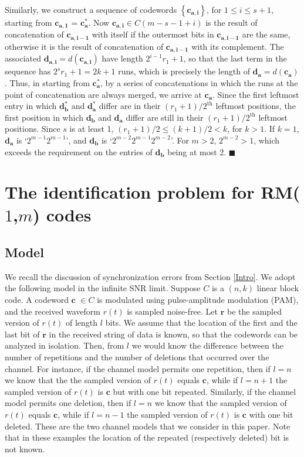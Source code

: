Similarly, we construct a sequence of codewords
$\left\{\mathbf{c_{a,i}}\right\}$, for $1 \leq i \leq s+1$,
starting from $\mathbf{c_{a,1}}$ = $\mathbf{c_a^{*}}$. Now
$\mathbf{c_{a,i}} \in C(m-s-1+i)$ is the result of concatenation
of $\mathbf{c_{a,i-1}}$ with itself if the outermost bits in
$\mathbf{c_{a,i-1}}$ are the same, otherwise it is  the result of
concatenation of $\mathbf{c_{a,i-1}}$ with its complement. The
associated $\mathbf{d_{a,i}}=d(\mathbf{c_{a,i}})$ have length
$2^{i-1}r_1+1$, so that the last term in the sequence has
$2^sr_1+1=2k+1$ runs, which is precisely the length of
$\mathbf{d_a}=d(\mathbf{c_a})$. Thus, in starting from
$\mathbf{c_a^{*}}$, by a series of concatenations in which the
runs at the point of concatenation are always merged, we arrive at
$\mathbf{c_a}$. Since the first leftmost entry in which
$\mathbf{d_b^{*}}$ and $\mathbf{d_a^{*}}$ differ are in their
$(r_1+1)/2^{\text{th}}$ leftmost positions, the first position in
which $\mathbf{d_b}$ and $\mathbf{d_a}$ differ are still in their
$(r_1+1)/2^{\text{th}}$ leftmost positions. Since $s$ is at least
1, $(r_1+1)/2 \leq (k+1)/2 < k$, for $k>1$. If $k=1$,
$\mathbf{d_a}$ is `$2^{m-1}2^{m-1}$', and $\mathbf{d_b}$ is
`$2^{m-2}2^{m-1}2^{m-2}$'. For $m>2$, $2^{m-2}>1$, which exceeds
the requirement on the entries of $\mathbf{d_b}$ being at most 2.
\hfill$\blacksquare$



\section{The identification problem for RM($1$,$m$) codes}  \label{section4}

\subsection{Model}      \label{Model}


We recall the discussion of synchronization errors from Section
\ref{Intro}. We adopt the following model in the infinite SNR
limit. Suppose $C$ is a $(n,k)$ linear block code. A codeword
$\mathbf{c}$ $\in C$ is modulated using pulse-amplitude modulation
(PAM), and the received waveform $r(t)$ is sampled noise-free. Let
$\mathbf{r}$ be the sampled version of $r(t)$ of length $l$ bits.
We assume that the location of the first and the last bit of
$\mathbf{r}$ in the received string of data is known, so that the
codewords can be analyzed in isolation. Then, from $l$ we would
know the difference between the number of repetitions and the
number of deletions that occurred over the channel. For instance,
if the channel model permits one repetition, then if $l=n$ we know
that the the sampled version of $r(t)$ equals $\mathbf{c}$, while
if $l=n+1$ the sampled version of $r(t)$ is $\mathbf{c}$ but with
one bit repeated. Similarly, if the channel model permits one
deletion, then if $l=n$ we know that the sampled version of $r(t)$
equals $\mathbf{c}$, while if $l=n-1$ the sampled version of
$r(t)$ is $\mathbf{c}$ with one bit deleted. These are the two
channel models that we consider in this paper. Note that in these
examples the location of the repeated (respectively deleted) bit
is not known.

